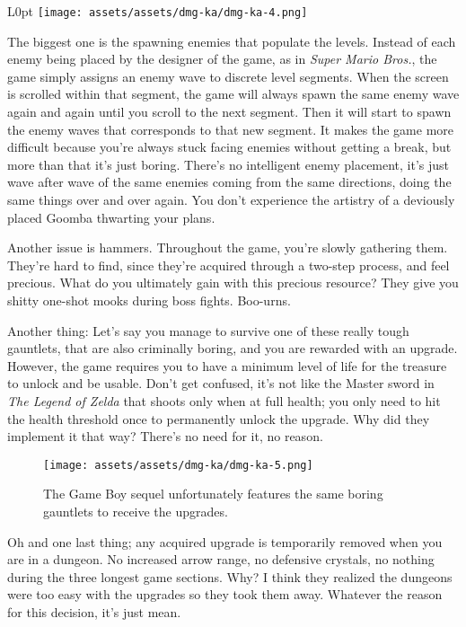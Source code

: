 \documentclass{book}
\begin{document}
\begin{wrapfigure}{L}{0pt} \texttt{[image: assets/assets/dmg-ka/dmg-ka-4.png]}\end{wrapfigure}
The biggest one is the spawning enemies that populate the levels. Instead of each enemy being placed by the designer of the game, as in \emph{Super Mario Bros.}, the game simply assigns an enemy wave to discrete level segments. When the screen is scrolled within that segment, the game will always spawn the same enemy wave again and again until you scroll to the next segment. Then it will start to spawn the enemy waves that corresponds to that new segment. It makes the game more difficult because you’re always stuck facing enemies without getting a break, but more than that it’s just boring. There’s no intelligent enemy placement, it’s just wave after wave of the same enemies coming from the same directions, doing the same things over and over again. You don’t experience the artistry of a deviously placed Goomba thwarting your plans.

Another issue is hammers. Throughout the game, you’re slowly gathering them. They’re hard to find, since they’re acquired through a two-step process, and feel precious. What do you ultimately gain with this precious resource? They give you shitty one-shot mooks during boss fights. Boo-urns.

Another thing: Let’s say you manage to survive one of these really tough gauntlets, that are also criminally boring, and you are rewarded with an upgrade. However, the game requires you to have a minimum level of life for the treasure to unlock and be usable. Don’t get confused, it’s not like the Master sword in \emph{The Legend of Zelda} that shoots only when at full health; you only need to hit the health threshold once to permanently unlock the upgrade. Why did they implement it that way? There’s no need for it, no reason.

\begin{figure}[hbt]
\vskip 10pt
\centering \texttt{[image: assets/assets/dmg-ka/dmg-ka-5.png]}\par\pagetwodescription The Game Boy sequel unfortunately features the same boring gauntlets to receive the upgrades.
\vskip 6pt
\end{figure}

Oh and one last thing; any acquired upgrade is temporarily removed when you are in a dungeon. No increased arrow range, no defensive crystals, no nothing during the three longest game sections. Why? I think they realized the dungeons were too easy with the upgrades so they took them away. Whatever the reason for this decision, it’s just mean.
\end{document}
